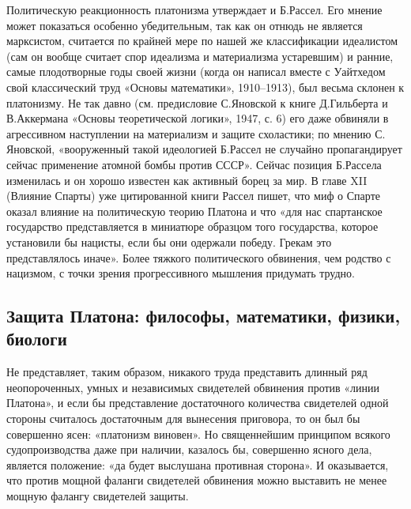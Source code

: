Политическую  реакционность  платонизма  утверждает  и  Б.Рассел.  Его
мнение  может  показаться особенно  убедительным,  так  как он  отнюдь
не  является  марксистом,  считается  по  крайней  мере  по  нашей  же
классификации  идеалистом  (сам он  вообще  считает  спор идеализма  и
материализма устаревшим) и ранние, самые плодотворные годы своей жизни
(когда он  написал вместе с  Уайтхедом свой классический  труд «Основы
математики»,  1910--1913), был  весьма  склонен к  платонизму. Не  так
давно (см.  предисловие С.Яновской  к книге Д.Гильберта  и В.Аккермана
«Основы  теоретической  логики»,  1947,  с. 6)  его  даже  обвиняли  в
агрессивном наступлении на материализм  и защите схоластики; по мнению
С.  Яновской,  «вооруженный  такой  идеологией  Б.Рассел  не  случайно
пропагандирует сейчас  применение атомной  бомбы против  СССР». Сейчас
позиция Б.Рассела изменилась  и он хорошо известен  как активный борец
за мир.  В главе  XII (Влияние Спарты)  уже цитированной  книги Рассел
пишет, что миф о Спарте  оказал влияние на политическую теорию Платона
и  что «для  нас  спартанское государство  представляется в  миниатюре
образцом того государства, которое установили  бы нацисты, если бы они
одержали  победу.  Грекам  это представлялось  иначе».  Более  тяжкого
политического  обвинения,  чем  родство  с нацизмом,  с  точки  зрения
прогрессивного мышления придумать трудно.

\subsection{Защита Платона: философы, математики, физики, биологи}

Не представляет, таким образом, никакого труда представить длинный ряд
неопороченных, умных и независимых  свидетелей обвинения против «линии
Платона», и  если бы представление достаточного  количества свидетелей
одной стороны считалось достаточным для вынесения приговора, то он был
бы  совершенно ясен:  «платонизм виновен».  Но священнейшим  принципом
всякого  судопроизводства даже  при наличии,  казалось бы,  совершенно
ясного  дела,  является  положение:   «да  будет  выслушана  противная
сторона».  И   оказывается,  что  против  мощной   фаланги  свидетелей
обвинения можно выставить не менее мощную фалангу свидетелей защиты.

